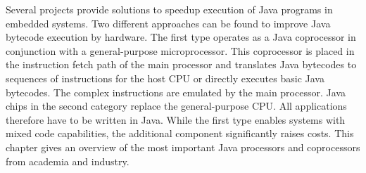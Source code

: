 
Several projects provide solutions to speedup execution of Java
programs in embedded systems. Two different approaches can be found
to improve Java bytecode execution by hardware. The first type
operates as a Java coprocessor in conjunction with a general-purpose
microprocessor. This coprocessor is placed in the instruction fetch
path of the main processor and translates Java bytecodes to sequences
of instructions for the host CPU or directly executes basic Java
bytecodes. The complex instructions are emulated by the main
processor. Java chips in the second category replace the
general-purpose CPU. All applications therefore have to be written in
Java. While the first type enables systems with mixed code
capabilities, the additional component significantly raises costs.
This chapter gives an overview of the most important Java processors
and coprocessors from academia and industry.
%
%
%
%
%
%
